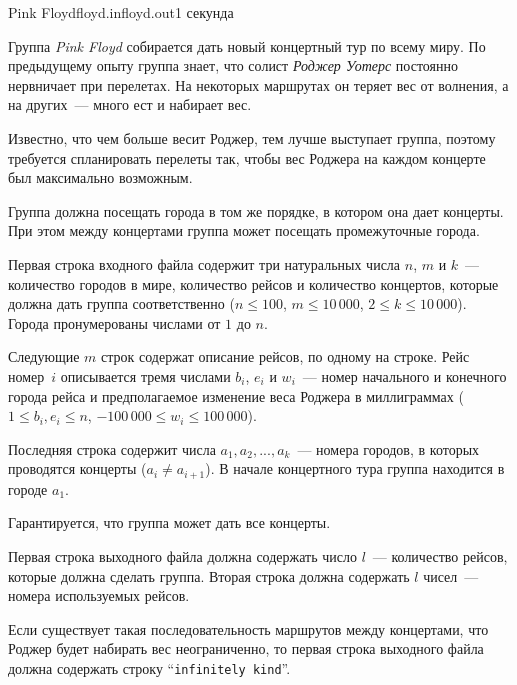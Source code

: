 \begin{problem}{Pink Floyd}{floyd.in}{floyd.out}{1 секунда}{}

Группа \emph{Pink Floyd} собирается дать новый концертный тур по 
всему миру. По предыдущему опыту группа знает, что солист 
\emph{Роджер Уотерс} постоянно нервничает при перелетах. На некоторых 
маршрутах он теряет вес от волнения, а на других~--- много ест и 
набирает вес. 

Известно, что чем больше весит Роджер, тем лучше выступает группа, 
поэтому требуется спланировать перелеты так, чтобы вес Роджера на 
каждом концерте был максимально возможным.

Группа должна посещать города в том же порядке, в котором она дает 
концерты. При этом между концертами группа может посещать
промежуточные города.

\InputFile

Первая строка входного файла содержит три натуральных числа $n$, 
$m$ и $k$~--- количество городов в мире, количество рейсов и 
количество концертов, которые должна дать группа соответственно 
($n \leqslant 100$, $m \leqslant 10\,000$, $2 \leqslant k \leqslant 10\,000$). Города 
пронумерованы числами от $1$ до $n$.

Следующие $m$ строк содержат описание рейсов, по одному на строке. 
Рейс номер~$i$ описывается тремя числами $b_i$, $e_i$ и $w_i$~---
номер начального и конечного города рейса и предполагаемое изменение 
веса Роджера в миллиграммах ($1 \leqslant b_i, e_i \leqslant n$, 
$-100\,000 \leqslant w_i \leqslant 100\,000$).

Последняя строка содержит числа $a_1, a_2, ..., a_k$~--- номера городов, в 
которых проводятся концерты ($a_i \neq a_{i+1}$). В начале концертного тура 
группа находится в городе $a_1$.

Гарантируется, что группа может дать все концерты.

\OutputFile        

Первая строка выходного файла должна содержать число $l$~--- 
количество рейсов, которые должна сделать группа. Вторая строка 
должна содержать $l$ чисел~--- номера используемых рейсов.

Если существует такая последовательность маршрутов между концертами, 
что Роджер будет набирать вес неограниченно, то первая строка выходного 
файла должна содержать строку ``\texttt{infinitely kind}''.

\Example

\begin{example}
%
%
\end{example}

\end{problem}
